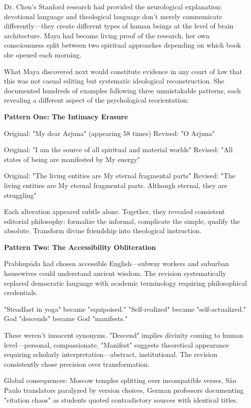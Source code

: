 \documentclass[11pt,twoside]{book}
\begin{document}
Dr. Chen's Stanford research had provided the neurological explanation: devotional language and theological language don't merely communicate differently—they create different types of human beings at the level of brain architecture. Maya had become living proof of the research, her own consciousness split between two spiritual approaches depending on which book she opened each morning.

What Maya discovered next would constitute evidence in any court of law that this was not casual editing but systematic ideological reconstruction. She documented hundreds of examples following three unmistakable patterns, each revealing a different aspect of the psychological reorientation:

\textbf{\textbf{Pattern One: The Intimacy Erasure}}

Original: "My dear Arjuna" (appearing 58 times)
Revised: "O Arjuna" 

Original: "I am the source of all spiritual and material worlds"
Revised: "All states of being are manifested by My energy"

Original: "The living entities are My eternal fragmental parts"  
Revised: "The living entities are My eternal fragmental parts. Although eternal, they are struggling"

Each alteration appeared subtle alone. Together, they revealed consistent editorial philosophy: formalize the informal, complicate the simple, qualify the absolute. Transform divine friendship into theological instruction.

\textbf{\textbf{Pattern Two: The Accessibility Obliteration}}

Prabhupāda had chosen accessible English—subway workers and suburban housewives could understand ancient wisdom. The revision systematically replaced democratic language with academic terminology requiring philosophical credentials.

"Steadfast in yoga" became "equipoised." "Self-realized" became "self-actualized." God "descends" became God "manifests."

These weren't innocent synonyms. "Descend" implies divinity coming to human level—personal, compassionate. "Manifest" suggests theoretical appearance requiring scholarly interpretation—abstract, institutional. The revision consistently chose precision over transformation.

Global consequences: Moscow temples splitting over incompatible verses, São Paulo translators paralyzed by version choices, German professors documenting "citation chaos" as students quoted contradictory sources with identical titles.
\end{document}
